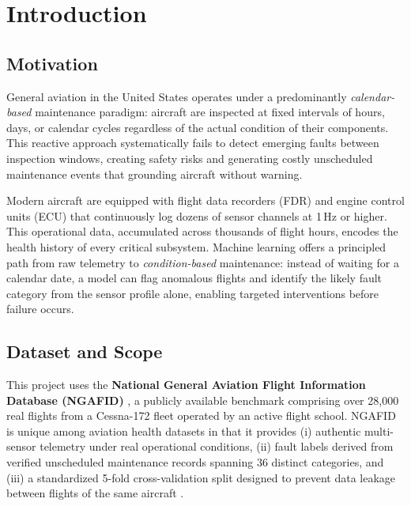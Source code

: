 \section{Introduction}
\label{sec:intro}

\subsection{Motivation}

General aviation in the United States operates under a predominantly
\textit{calendar-based} maintenance paradigm: aircraft are inspected at fixed
intervals of hours, days, or calendar cycles regardless of the actual condition
of their components. This reactive approach systematically fails to detect
emerging faults between inspection windows, creating safety risks and generating
costly unscheduled maintenance events that grounding aircraft without warning.

Modern aircraft are equipped with flight data recorders (FDR) and engine control
units (ECU) that continuously log dozens of sensor channels at 1\,Hz or higher.
This operational data, accumulated across thousands of flight hours, encodes the
health history of every critical subsystem. Machine learning offers a principled
path from raw telemetry to \textit{condition-based} maintenance: instead of
waiting for a calendar date, a model can flag anomalous flights and identify the
likely fault category from the sensor profile alone, enabling targeted
interventions before failure occurs.

\subsection{Dataset and Scope}

This project uses the \textbf{National General Aviation Flight Information
Database (NGAFID)} \cite{ngafid2021}, a publicly available benchmark comprising
over 28{,}000 real flights from a Cessna-172 fleet operated by an active flight
school. NGAFID is unique among aviation health datasets in that it provides
(i) authentic multi-sensor telemetry under real operational conditions,
(ii) fault labels derived from verified unscheduled maintenance records
spanning 36 distinct categories, and (iii) a standardized 5-fold cross-validation
split designed to prevent data leakage between flights of the same aircraft
\cite{convtok2023}.

